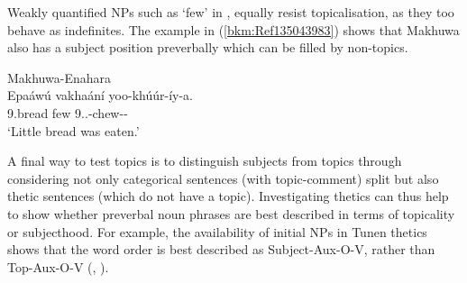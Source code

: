 \documentclass[output=paper]{langscibook}
\begin{document}
\z

Weakly quantified NPs such as ‘few’ in , equally resist topicalisation, as they too behave as indefinites. The example in (\ref{bkm:Ref135043983}) shows that Makhuwa also has a subject position preverbally which can be filled by non-topics.

\ea
\label{bkm:Ref135043983}
Makhuwa-Enahara \citep[176]{vanderWal2009}\\
\gll
Epaáwú  vakhaání  yoo-khúúr-íy-a.\\
9.bread  few  9\SM{}.\PFV{}.\DJ{}-chew-\PASS-\FV{}\\
\glt
‘Little bread was eaten.’\\


\z

A final way to test topics is to distinguish subjects from topics through considering not only categorical sentences (with topic-comment) split but also thetic sentences (which do not have a topic). Investigating thetics can thus help to show whether preverbal noun phrases are best described in terms of topicality or subjecthood. For example, the availability of initial NPs in Tunen thetics shows that the word order is best described as Subject-Aux-O-V, rather than Top-Aux-O-V (, \cite{chapters/tunen}). 
\end{document}
